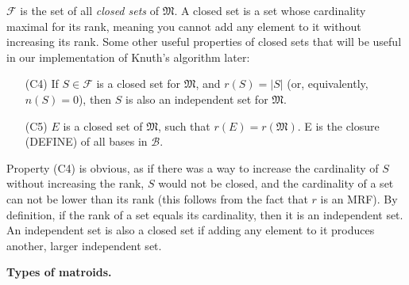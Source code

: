 $\mathcal{F}$ is the set of all \textit{closed sets} of $\mathfrak{M}$. A closed set is a set whose cardinality maximal for its rank, meaning you cannot add any element to it without increasing its rank. Some other useful properties of closed sets that will be useful in our implementation of Knuth's algorithm later:

\begin{itemize}
  \item [(C4)] If $S \in \mathcal{F}$ is a closed set for $\mathfrak{M}$, and $r(S) = |S|$ (or, equivalently, $n(S) = 0$), then $S$ is also an independent set for $\mathfrak{M}$.
  \item [(C5)] $E$ is a closed set of $\mathfrak{M}$, such that $r(E) = r(\mathfrak{M})$. E is the closure (DEFINE) of all bases in $\mathcal{B}$.
\end{itemize}

Property (C4) is obvious, as if there was a way to increase the cardinality of $S$ without increasing the rank, $S$ would not be closed, and the cardinality of a set can not be lower than its rank (this follows from the fact that $r$ is an MRF). By definition, if the rank of a set equals its cardinality, then it is an independent set. An independent set is also a closed set if adding any element to it produces another, larger independent set.

\textbf{Types of matroids.} 
